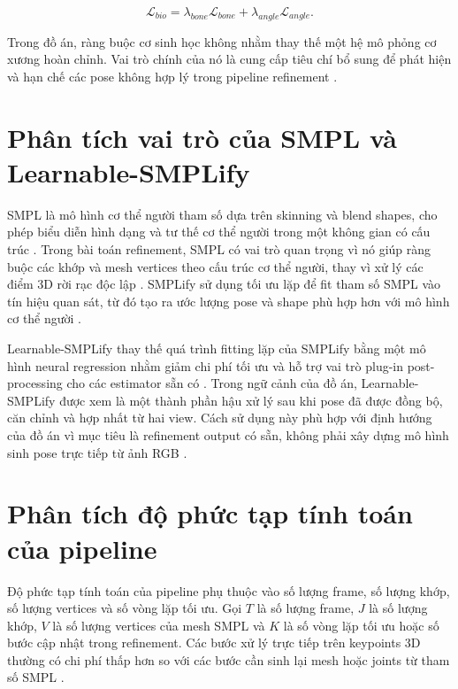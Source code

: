 \documentclass[../DoAn.tex]{subfiles}
\begin{document}
\begin{equation}
\mathcal{L}_{bio}
=
\lambda_{bone}\mathcal{L}_{bone}
+
\lambda_{angle}\mathcal{L}_{angle}.
\end{equation}

Trong đồ án, ràng buộc cơ sinh học không nhằm thay thế một hệ mô phỏng cơ xương hoàn chỉnh. Vai trò chính của nó là cung cấp tiêu chí bổ sung để phát hiện và hạn chế các pose không hợp lý trong pipeline refinement \cite{delp2007opensim,uhlrich2023opencap,physcap2020}.

\section{Phân tích vai trò của SMPL và Learnable-SMPLify}

SMPL là mô hình cơ thể người tham số dựa trên skinning và blend shapes, cho phép biểu diễn hình dạng và tư thế cơ thể người trong một không gian có cấu trúc \cite{smpl2015}. Trong bài toán refinement, SMPL có vai trò quan trọng vì nó giúp ràng buộc các khớp và mesh vertices theo cấu trúc cơ thể người, thay vì xử lý các điểm 3D rời rạc độc lập \cite{smpl2015}. SMPLify sử dụng tối ưu lặp để fit tham số SMPL vào tín hiệu quan sát, từ đó tạo ra ước lượng pose và shape phù hợp hơn với mô hình cơ thể người \cite{smplify2016}.

Learnable-SMPLify thay thế quá trình fitting lặp của SMPLify bằng một mô hình neural regression nhằm giảm chi phí tối ưu và hỗ trợ vai trò plug-in post-processing cho các estimator sẵn có \cite{yang2025learnable}. Trong ngữ cảnh của đồ án, Learnable-SMPLify được xem là một thành phần hậu xử lý sau khi pose đã được đồng bộ, căn chỉnh và hợp nhất từ hai view. Cách sử dụng này phù hợp với định hướng của đồ án vì mục tiêu là refinement output có sẵn, không phải xây dựng mô hình sinh pose trực tiếp từ ảnh RGB \cite{yang2025learnable,shin2024wham}.

\section{Phân tích độ phức tạp tính toán của pipeline}

Độ phức tạp tính toán của pipeline phụ thuộc vào số lượng frame, số lượng khớp, số lượng vertices và số vòng lặp tối ưu. Gọi $T$ là số lượng frame, $J$ là số lượng khớp, $V$ là số lượng vertices của mesh SMPL và $K$ là số vòng lặp tối ưu hoặc số bước cập nhật trong refinement. Các bước xử lý trực tiếp trên keypoints 3D thường có chi phí thấp hơn so với các bước cần sinh lại mesh hoặc joints từ tham số SMPL \cite{smpl2015,smplify2016}.
\end{document}
